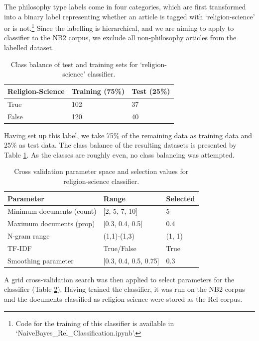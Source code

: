 \documentclass{article}
\begin{document}
The philosophy type labels come in four categories, which are first transformed into a binary label representing whether an article is tagged with `religion-science' or is not.\footnote{Code for the training of this classifier is available in `NaiveBayes\_\-Rel\_\-Classification.ipynb'.} Since the labelling is hierarchical, and we are aiming to apply to classifier to the NB2 corpus, we exclude all non-philosophy articles from the labelled dataset.

\begin{table}
  \centering
  \begin{tabular}{l|ll}
    \textbf{Religion-Science} & \textbf{Training (75\%)} & \textbf{Test} (25\%)\\ \hline
    True & 102 & 37 \\
    False & 120 & 40 \\
  \end{tabular}
  \caption{Class balance of test and training sets for `religion-science' classifier.}
  \label{t:rel-nbc-classes}
\end{table}

Having set up this label, we take 75\% of the remaining data as training data and 25\% as test data. The class balance of the resulting datasets is presented by Table \ref{t:rel-nbc-classes}. As the classes are roughly even, no class balancing was attempted.

\begin{table}[]
  \centering
  \footnotesize
  \begin{tabular}{l|ll}
      Parameter & Range & Selected \\
      \hline
      Minimum documents (count) & [2, 5, 7, 10] &  5 \\
      Maximum documents (prop) & [0.3, 0.4, 0.5] & 0.4 \\
      N-gram range & (1,1)-(1,3) & (1, 1) \\
      TF-IDF & True/False & True \\
      Smoothing parameter & [0.3, 0.4, 0.5, 0.75] & 0.3 \\
  \end{tabular}
  \caption{Cross validation parameter space and selection values for religion-science classifier.}
  \label{t:CV-relsci}
\end{table}

A grid cross-validation search was then applied to select parameters for the classifier (Table \ref{t:CV-relsci}). Having trained the classifier, it was run on the NB2 corpus and the documents classified as religion-science were stored as the Rel corpus.
\end{document}
